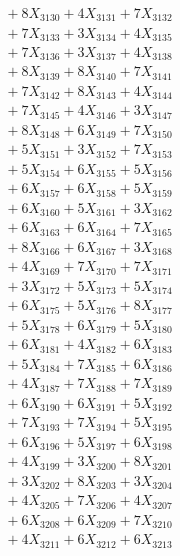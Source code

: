 \documentclass[a4paper,10pt]{article}
\begin{document}
{\begin{align}
&\;  + 8 X_{3130} + 4 X_{3131} + 7 X_{3132} \\[0.3ex]
&\;  + 7 X_{3133} + 3 X_{3134} + 4 X_{3135} \\[0.3ex]
&\;  + 7 X_{3136} + 3 X_{3137} + 4 X_{3138} \\[0.3ex]
&\;  + 8 X_{3139} + 8 X_{3140} + 7 X_{3141} \\[0.3ex]
&\;  + 7 X_{3142} + 8 X_{3143} + 4 X_{3144} \\[0.3ex]
&\;  + 7 X_{3145} + 4 X_{3146} + 3 X_{3147} \\[0.3ex]
&\;  + 8 X_{3148} + 6 X_{3149} + 7 X_{3150} \\[0.3ex]
&\;  + 5 X_{3151} + 3 X_{3152} + 7 X_{3153} \\[0.3ex]
&\;  + 5 X_{3154} + 6 X_{3155} + 5 X_{3156} \\[0.3ex]
&\;  + 6 X_{3157} + 6 X_{3158} + 5 X_{3159} \\[0.5ex]\allowbreak
&\;  + 6 X_{3160} + 5 X_{3161} + 3 X_{3162} \\[0.3ex]
&\;  + 6 X_{3163} + 6 X_{3164} + 7 X_{3165} \\[0.3ex]
&\;  + 8 X_{3166} + 6 X_{3167} + 3 X_{3168} \\[0.3ex]
&\;  + 4 X_{3169} + 7 X_{3170} + 7 X_{3171} \\[0.3ex]
&\;  + 3 X_{3172} + 5 X_{3173} + 5 X_{3174} \\[0.3ex]
&\;  + 6 X_{3175} + 5 X_{3176} + 8 X_{3177} \\[0.3ex]
&\;  + 5 X_{3178} + 6 X_{3179} + 5 X_{3180} \\[0.3ex]
&\;  + 6 X_{3181} + 4 X_{3182} + 6 X_{3183} \\[0.3ex]
&\;  + 5 X_{3184} + 7 X_{3185} + 6 X_{3186} \\[0.3ex]
&\;  + 4 X_{3187} + 7 X_{3188} + 7 X_{3189} \\[0.5ex]\allowbreak
&\;  + 6 X_{3190} + 6 X_{3191} + 5 X_{3192} \\[0.3ex]
&\;  + 7 X_{3193} + 7 X_{3194} + 5 X_{3195} \\[0.3ex]
&\;  + 6 X_{3196} + 5 X_{3197} + 6 X_{3198} \\[0.3ex]
&\;  + 4 X_{3199} + 3 X_{3200} + 8 X_{3201} \\[0.3ex]
&\;  + 3 X_{3202} + 8 X_{3203} + 3 X_{3204} \\[0.3ex]
&\;  + 4 X_{3205} + 7 X_{3206} + 4 X_{3207} \\[0.3ex]
&\;  + 6 X_{3208} + 6 X_{3209} + 7 X_{3210} \\[0.3ex]
&\;  + 4 X_{3211} + 6 X_{3212} + 6 X_{3213} \\[0.3ex]

\end{align}}
\end{document}
